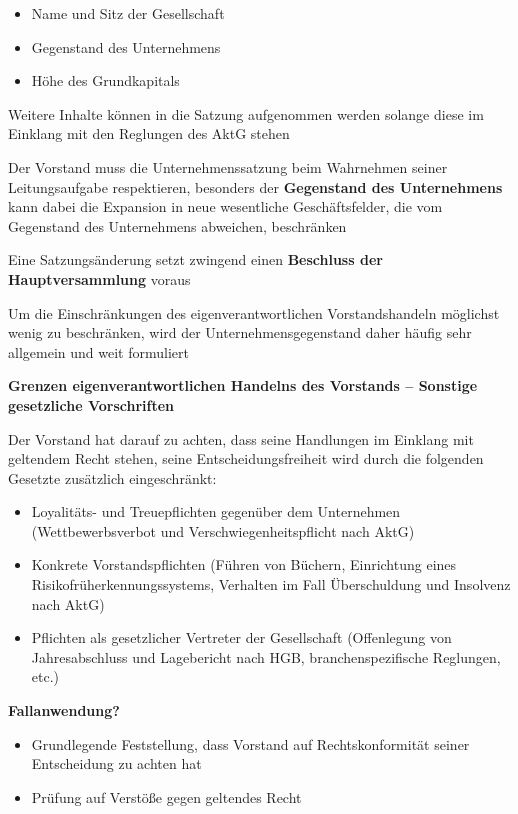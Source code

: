\documentclass[
]{article}
\providecommand{\tightlist}{%
  \setlength{\itemsep}{0pt}\setlength{\parskip}{0pt}}
\begin{document}
\begin{itemize}
\tightlist
\item
  Name und Sitz der Gesellschaft
\item
  Gegenstand des Unternehmens
\item
  Höhe des Grundkapitals
\end{itemize}

Weitere Inhalte können in die Satzung aufgenommen werden solange diese
im Einklang mit den Reglungen des AktG stehen

Der Vorstand muss die Unternehmenssatzung beim Wahrnehmen seiner
Leitungsaufgabe respektieren, besonders der \textbf{Gegenstand des
Unternehmens} kann dabei die Expansion in neue wesentliche
Geschäftsfelder, die vom Gegenstand des Unternehmens abweichen,
beschränken

Eine Satzungsänderung setzt zwingend einen \textbf{Beschluss der
Hauptversammlung} voraus

Um die Einschränkungen des eigenverantwortlichen Vorstandshandeln
möglichst wenig zu beschränken, wird der Unternehmensgegenstand daher
häufig sehr allgemein und weit formuliert

\textbf{Grenzen eigenverantwortlichen Handelns des Vorstands -- Sonstige
gesetzliche Vorschriften}

Der Vorstand hat darauf zu achten, dass seine Handlungen im Einklang mit
geltendem Recht stehen, seine Entscheidungsfreiheit wird durch die
folgenden Gesetzte zusätzlich eingeschränkt:

\begin{itemize}
\tightlist
\item
  Loyalitäts- und Treuepflichten gegenüber dem Unternehmen
  (Wettbewerbsverbot und Verschwiegenheitspflicht nach AktG)
\item
  Konkrete Vorstandspflichten (Führen von Büchern, Einrichtung eines
  Risikofrüherkennungssystems, Verhalten im Fall Überschuldung und
  Insolvenz nach AktG)
\item
  Pflichten als gesetzlicher Vertreter der Gesellschaft (Offenlegung von
  Jahresabschluss und Lagebericht nach HGB, branchenspezifische
  Reglungen, etc.)
\end{itemize}

\textbf{Fallanwendung?}

\begin{itemize}
\tightlist
\item
  Grundlegende Feststellung, dass Vorstand auf Rechtskonformität seiner
  Entscheidung zu achten hat
\item
  Prüfung auf Verstöße gegen geltendes Recht
\end{itemize}
\end{document}
